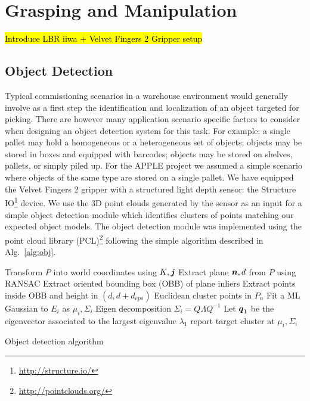 \section{Grasping and Manipulation}
\label{sec:manip}
%
\hl{Introduce LBR iiwa + Velvet Fingers 2 Gripper setup}
%
\subsection{Object Detection}
Typical commissioning scenarios in a warehouse environment would generally involve as a first step the identification and localization of an object targeted for picking.
There are however many application scenario specific factors to consider when designing an object detection system for this task. 
For example: a single pallet may hold a homogeneous or a heterogeneous set of objects; objects may be stored in boxes and equipped with barcodes; objects may be stored on shelves, pallets, or simply piled up.
For the APPLE project we assumed a simple scenario where objects of the same type are stored on a single pallet.
We have equipped the Velvet Fingers 2 gripper with a structured light depth sensor: the Structure IO\footnote{\url{http://structure.io/}} device. 
We use the 3D point clouds generated by the sensor as an input for a simple object detection module which identifies clusters of points matching our expected object models.
The object detection module was implemented using the point cloud library (PCL)\footnote{\url{http://pointclouds.org/}} following the simple algorithm described in Alg.~\ref{alg:obj}.
%
\begin{algorithm}[tbh]
{}
Transform $P$ into world coordinates using $K,\mbox{\boldmath $j$}$\;
 {
    Extract plane $\mbox{\boldmath $n$},d$ from $P$ using RANSAC\;
}
Extract oriented bounding box (OBB) of plane inliers\;
Extract points inside OBB and height in $(d,d+d_{eps})$\;
Euclidean cluster points in $P_n$\;
 {
    Fit a ML Gaussian to $E_i$ as $\mu_i,\Sigma_i$\;
    Eigen decomposition $\Sigma_i=Q\Lambda Q^{-1}$\;
    Let $\mbox{\boldmath $q$}_1$ be the eigenvector associated to the largest eigenvalue $\lambda_1$\;
     {report target cluster at $\mu_i,\Sigma_i$\;}
}
\caption{Object detection algorithm}\label{alg:obj}
\end{algorithm}
